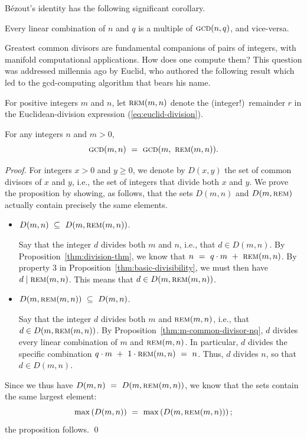 B\'{e}zout's identity has the following significant corollary.

\begin{corol}
Every linear combination of $n$ and $q$ is a multiple of $\mbox{\sc
  gcd}(n,q)$, and vice-versa.
\end{corol}

Greatest common divisors are fundamental companions of pairs of
integers, with manifold computational applications.  How does one
compute them?  This question was addressed millennia ago by Euclid,
 who authored the following result which led to the 
{\sc gcd}-computing algorithm that bears his name.

For positive integers $m$ and $n$, let $\mbox{\sc rem}(m,n)$ denote the
(integer!)~remainder $r$ in the Euclidean-division expression
(\ref{eq:euclid-division}).  


\begin{prop}
\label{thm:gcd-basis}
For any integers $n$ and $m > 0$,
\[ \mbox{\sc gcd}(m,n) \ = \  \mbox{\sc gcd}(m, \ \mbox{\sc rem}(m,n)) . \]
\end{prop}

\begin{proof}
For integers $x > 0$ and $y \geq 0$, we denote by $D(x,y)$ the set of
common divisors of $x$ and $y$, i.e., the set of integers that divide
both $x$ and $y$.  We prove the proposition by showing, as follows,
that the sets $D(m, n)$ and $D(m, \mbox{\sc rem})$ actually contain
precisely the same elements.
\begin{itemize}
\item 
$D(m, n) \ \subseteq \ D(m, \mbox{\sc rem}(m,n))$.

Say that the integer $d$ divides both $m$ and $n$, i.e., that $d \in
D(m,n)$.  By Proposition~\ref{thm:division-thm}, we know that $n \ =
\ q \cdot m \ + \ \mbox{\sc rem}(m,n)$.  By property 3 in
Proposition~\ref{thm:basic-divisibility}, we must then have $d \mid
\mbox{\sc rem}(m,n)$.  This means that $d \in D(m, \mbox{\sc rem}(m,n))$.

\item 
$D(m, \mbox{\sc rem}(m,n)) \ \subseteq \ D(m,n)$.

Say that the integer $d$ divides both $m$ and $\mbox{\sc rem}(m,n)$,
i.e., that $d \in D(m, \mbox{\sc rem}(m,n))$.  By
Proposition~\ref{thm:m-common-divisor-nq}, $d$ divides every linear
combination of $m$ and $\mbox{\sc rem}(m,n)$.  In particular, $d$
divides the specific combination $q \cdot m \ + \ 1 \cdot \mbox{\sc
  rem}(m,n) \ = \ n$.  Thus, $d$ divides $n$, so that $d \in D(m,n)$.
\end{itemize}
Since we thus have $D(m, n) \ = \ D(m, \mbox{\sc rem}(m,n))$, we know
that the sets contain the same largest element:
\[ \max\left( D(m, n) \right) \ = \ \max\left( D(m, \mbox{\sc
  rem}(m,n)) \right);
\]
the proposition follows.
\qed
\end{proof}


